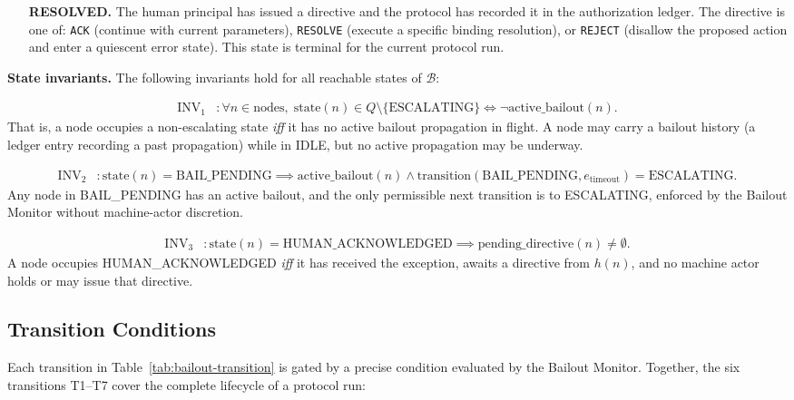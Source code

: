 \begin{itemize}
\item[\textbf{RESOLVED.}] The human principal has issued a directive and the protocol has recorded it in the authorization ledger. The directive is one of: \texttt{ACK} (continue with current parameters), \texttt{RESOLVE} (execute a specific binding resolution), or \texttt{REJECT} (disallow the proposed action and enter a quiescent error state). This state is terminal for the current protocol run.
\end{itemize}

\medskip\noindent\textbf{State invariants.} The following invariants hold for all reachable states of $\mathcal{B}$:

\begin{align}
\text{INV}_1 &: \forall n \in \text{nodes},\; \text{state}(n) \in Q \setminus \{\text{ESCALATING}\} \iff \neg\text{active\_bailout}(n). \tag{INV-1}
\end{align}
That is, a node occupies a non-escalating state \emph{iff} it has no active bailout propagation in flight. A node may carry a bailout history (a ledger entry recording a past propagation) while in IDLE, but no active propagation may be underway.

\begin{align}
\text{INV}_2 &: \text{state}(n) = \text{BAIL\_PENDING} \implies \text{active\_bailout}(n) \land \text{transition}(\text{BAIL\_PENDING}, e_{\text{timeout}}) = \text{ESCALATING}. \tag{INV-2}
\end{align}
Any node in BAIL\_PENDING has an active bailout, and the only permissible next transition is to ESCALATING, enforced by the Bailout Monitor without machine-actor discretion.

\begin{align}
\text{INV}_3 &: \text{state}(n) = \text{HUMAN\_ACKNOWLEDGED} \implies \text{pending\_directive}(n) \neq \emptyset. \tag{INV-3}
\end{align}
A node occupies HUMAN\_ACKNOWLEDGED \emph{iff} it has received the exception, awaits a directive from $h(n)$, and no machine actor holds or may issue that directive.

\subsection{Transition Conditions}\label{sec:transition-conditions}

Each transition in Table~\ref{tab:bailout-transition} is gated by a precise condition evaluated by the Bailout Monitor. Together, the six transitions T1–T7 cover the complete lifecycle of a protocol run:

